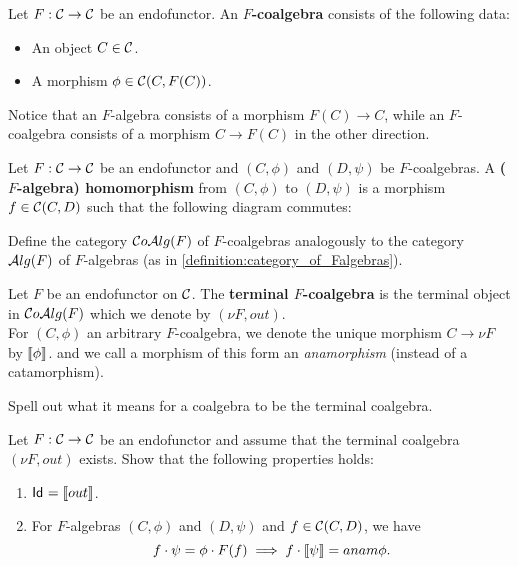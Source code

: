 \begin{dfn} Let $F:\mathcal{C}\to \mathcal{C}$ be an endofunctor. An \textbf{$F$-coalgebra} consists of the following data:
\begin{itemize}
\item An object $C\in \mathcal{C}$.
\item A morphism $\phi \in {\mathcal{C}}(C,F(C))$.
\end{itemize}
\end{dfn}
Notice that an $F$-algebra consists of a morphism $F(C)\to C$, while an $F$-coalgebra consists of a morphism $C\to F(C)$ in the other direction.

\begin{dfn} Let $F:\mathcal{C}\to \mathcal{C}$ be an endofunctor and $(C,\phi)$ and $(D,\psi)$ be $F$-coalgebras. A \textbf{($F$-algebra) homomorphism} from $(C,\phi)$ to $(D,\psi)$ is a morphism $f\in {\mathcal{C}}(C,D)$ such that the following diagram commutes:
\begin{center}
\end{center}
\end{dfn}

\begin{exer} Define the category $\mathcal{C}o\mathcal{A}lg(F)$ of $F$-coalgebras analogously to the category $\mathcal{A}lg(F)$ of $F$-algebras (as in \cref{definition:category_of_Falgebras}).
\end{exer}

\begin{dfn} Let $F$ be an endofunctor on $\mathcal{C}$. The \textbf{terminal $F$-coalgebra} is the terminal object in $\mathcal{C}o\mathcal{A}lg(F)$ which we denote by $(\nu F, out)$.\\
For $(C,\phi)$ an arbitrary $F$-coalgebra, we denote the unique morphism $C\to \nu F$ by $\llbracket \phi \rrbracket$. and we call a morphism of this form an \textit{anamorphism} (instead of a catamorphism).
\end{dfn}

\begin{exer} Spell out what it means for a coalgebra to be the terminal coalgebra.
\end{exer}

\begin{exer} Let $F:\mathcal{C}\to\mathcal{C}$ be an endofunctor and assume that the terminal coalgebra $(\nu F, out)$ exists. Show that the following properties holds:
\begin{enumerate}
\item $\mathsf{Id}_{} = \llbracket out \rrbracket$.
\item For $F$-algebras $(C,\phi)$ and $(D,\psi)$ and $f\in{\mathcal{C}}(C,D)$, we have 
\[
f\cdot\psi  = \phi\cdot F(f) \implies f\cdot\llbracket \psi \rrbracket = anam{\phi}.
\]
\end{enumerate} 
\end{exer}

